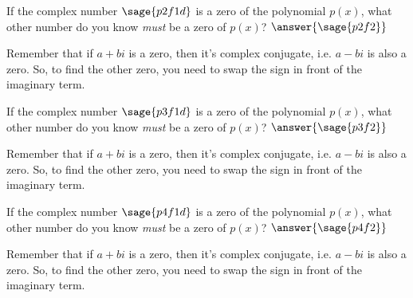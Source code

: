 \documentclass{ximera}
\begin{document}
\begin{problem}
    If the complex number $\sage{p2f1d}$ is a zero of the polynomial $p(x)$, what other number do you know \emph{must} be a zero of $p(x)$? $\answer{\sage{p2f2}}$
    \begin{feedback}
        Remember that if $a + bi$ is a zero, then it's complex conjugate, i.e. $a - bi$ is also a zero. So, to find the other zero, you need to swap the sign in front of the imaginary term.
    \end{feedback}
    
\end{problem}


\begin{problem}
    If the complex number $\sage{p3f1d}$ is a zero of the polynomial $p(x)$, what other number do you know \emph{must} be a zero of $p(x)$? $\answer{\sage{p3f2}}$
    \begin{feedback}
        Remember that if $a + bi$ is a zero, then it's complex conjugate, i.e. $a - bi$ is also a zero. So, to find the other zero, you need to swap the sign in front of the imaginary term.
    \end{feedback}
    
\end{problem}


\begin{problem}
    If the complex number $\sage{p4f1d}$ is a zero of the polynomial $p(x)$, what other number do you know \emph{must} be a zero of $p(x)$? $\answer{\sage{p4f2}}$
    \begin{feedback}
        Remember that if $a + bi$ is a zero, then it's complex conjugate, i.e. $a - bi$ is also a zero. So, to find the other zero, you need to swap the sign in front of the imaginary term.
    \end{feedback}
    
\end{problem}
\end{document}

